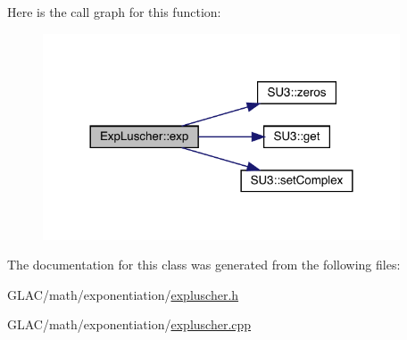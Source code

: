 Here is the call graph for this function\+:\nopagebreak
\begin{figure}[H]
\begin{center}
\leavevmode
\includegraphics[width=300pt]{class_exp_luscher_a8e4c0689c633728527e1220094c664c1_cgraph}
\end{center}
\end{figure}


The documentation for this class was generated from the following files\+:\begin{DoxyCompactItemize}
\item 
G\+L\+A\+C/math/exponentiation/\mbox{\hyperlink{expluscher_8h}{expluscher.\+h}}\item 
G\+L\+A\+C/math/exponentiation/\mbox{\hyperlink{expluscher_8cpp}{expluscher.\+cpp}}\end{DoxyCompactItemize}
